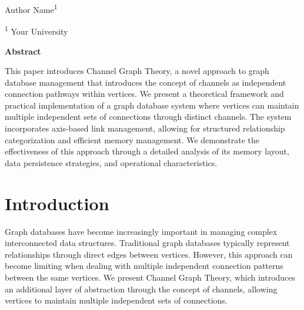 \vspace{30pt}
\begin{center}
    \LARGE{}
\end{center}

\begin{center}
\vspace{4pt}
\large
    Author Name\textsuperscript{1}
    
\small
   \textsuperscript{1} Your University

\end{center}



\begin{small}
\begin{center}
\vspace{9pt}
\textbf{Abstract}    
\end{center}

\begin{adjustwidth}{20pt}{20pt}
\small \noindent 
This paper introduces Channel Graph Theory, a novel approach to graph database management that introduces the concept of channels as independent connection pathways within vertices. We present a theoretical framework and practical implementation of a graph database system where vertices can maintain multiple independent sets of connections through distinct channels. The system incorporates axis-based link management, allowing for structured relationship categorization and efficient memory management. We demonstrate the effectiveness of this approach through a detailed analysis of its memory layout, data persistence strategies, and operational characteristics.
\end{adjustwidth}


\end{small}




\vspace{10pt}
\section{Introduction}\label{Sec:Introduction}
Graph databases have become increasingly important in managing complex interconnected data structures. Traditional graph databases typically represent relationships through direct edges between vertices. However, this approach can become limiting when dealing with multiple independent connection patterns between the same vertices. We present Channel Graph Theory, which introduces an additional layer of abstraction through the concept of channels, allowing vertices to maintain multiple independent sets of connections.

